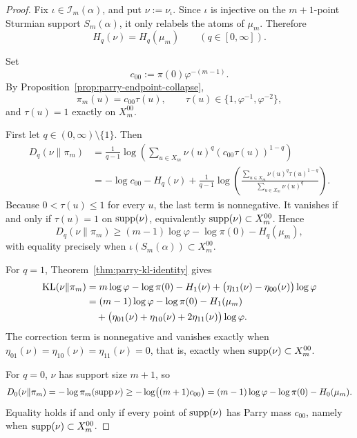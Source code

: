 \begin{proof}
Fix \(\iota\in\mathcal I_m(\alpha)\), and put \(\nu:=\nu_\iota\). Since
\(\iota\) is injective on the \(m+1\)-point Sturmian support \(S_m(\alpha)\),
it only relabels the atoms of \(\mu_m\). Therefore
\[
H_q(\nu)=H_q(\mu_m)
\qquad (q\in[0,\infty]).
\]

Set
\[
c_{00}:=\pi(0)\varphi^{-(m-1)}.
\]
By Proposition~\ref{prop:parry-endpoint-collapse},
\[
\pi_m(u)=c_{00}\tau(u),
\qquad
\tau(u)\in\{1,\varphi^{-1},\varphi^{-2}\},
\]
and \(\tau(u)=1\) exactly on \(X_m^{00}\).

First let \(q\in(0,\infty)\setminus\{1\}\). Then
\[
\begin{aligned}
D_q(\nu\|\pi_m)
&=
\frac{1}{q-1}
\log\!\left(\sum_{u\in X_m}\nu(u)^q(c_{00}\tau(u))^{1-q}\right)\\
&=
-\log c_{00}-H_q(\nu)
+
\frac{1}{q-1}
\log\!\left(
\frac{\sum_{u\in X_m}\nu(u)^q\tau(u)^{1-q}}
{\sum_{u\in X_m}\nu(u)^q}
\right).
\end{aligned}
\]
Because \(0<\tau(u)\le1\) for every \(u\), the last term is nonnegative. It
vanishes if and only if \(\tau(u)=1\) on \(\operatorname{supp}(\nu)\), equivalently
\(\operatorname{supp}(\nu)\subset X_m^{00}\). Hence
\[
D_q(\nu\|\pi_m)
\ge
(m-1)\log\varphi-\log\pi(0)-H_q(\mu_m),
\]
with equality precisely when \(\iota(S_m(\alpha))\subset X_m^{00}\).

For \(q=1\), Theorem~\ref{thm:parry-kl-identity} gives
\[
\begin{aligned}
\operatorname{KL}(\nu\|\pi_m)
&=
m\log\varphi-\log\pi(0)-H_1(\nu)
+
\bigl(\eta_{11}(\nu)-\eta_{00}(\nu)\bigr)\log\varphi\\
&=
(m-1)\log\varphi-\log\pi(0)-H_1(\mu_m)\\
&\quad
+
\bigl(\eta_{01}(\nu)+\eta_{10}(\nu)+2\eta_{11}(\nu)\bigr)\log\varphi.
\end{aligned}
\]
The correction term is nonnegative and vanishes exactly when
\(\eta_{01}(\nu)=\eta_{10}(\nu)=\eta_{11}(\nu)=0\), that is, exactly when
\(\operatorname{supp}(\nu)\subset X_m^{00}\).

For \(q=0\), \(\nu\) has support size \(m+1\), so
\[
D_0(\nu\|\pi_m)
=
-\log\pi_m(\operatorname{supp}\nu)
\ge
-\log\bigl((m+1)c_{00}\bigr)
=
(m-1)\log\varphi-\log\pi(0)-H_0(\mu_m).
\]
Equality holds if and only if every point of \(\operatorname{supp}(\nu)\) has Parry mass
\(c_{00}\), namely when \(\operatorname{supp}(\nu)\subset X_m^{00}\).


\end{proof}
